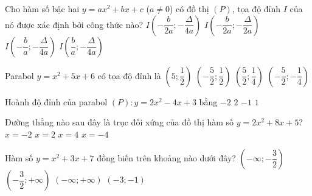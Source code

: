 \begin{ex}%
	Cho hàm số bậc hai $y=ax^2+bx+c$ ($a\ne 0$) có đồ thị $(P)$, tọa độ đỉnh $I$ của nó được xác định bởi công thức nào?
	\choice
	{\True $I\left(-\dfrac{b}{2a};-\dfrac{\Delta}{4a}\right)$}
	{$I\left(-\dfrac{b}{2a};-\dfrac{\Delta}{2a}\right)$}
	{$I\left(-\dfrac{b}{a};-\dfrac{\Delta}{4a}\right)$}
	{$I\left(\dfrac{b}{a};-\dfrac{\Delta}{4a}\right)$}
\end{ex}
\begin{ex}%
	Parabol $y=x^2+5x+6$ có tọa độ đỉnh là
	\choice
	{$\left(5;\dfrac{1}{2}\right)$}
	{$\left(-\dfrac{5}{2};\dfrac{1}{2}\right)$}
	{$\left(\dfrac{5}{2};\dfrac{1}{4}\right)$}
	{\True $\left(-\dfrac{5}{2};-\dfrac{1}{4}\right)$}
\end{ex}
\begin{ex}%
	Hoành độ đỉnh của parabol $(P) \colon y=2x^2-4x+3$ bằng
	\choice
	{$-2$}
	{$2$}
	{$-1$}
	{\True $1$}
\end{ex}
\begin{ex}%
	Đường thẳng nào sau đây là trục đối xứng của đồ thị hàm số $y=2x^2+8x+5$?
	\choice
	{\True$x=-2$}
	{$x=2$}
	{$x=4$}
	{$x=-4$}
\end{ex}
\begin{ex}%
	Hàm số $y=x^2+3x+7$ đồng biến trên khoảng nào dưới đây?
	\choice
	{$\left(-\infty;-\dfrac{3}{2}\right)$}
	{\True $\left(-\dfrac{3}{2};+\infty \right)$}
	{$(-\infty;+\infty)$}
	{$(-3;-1)$}
\end{ex}

